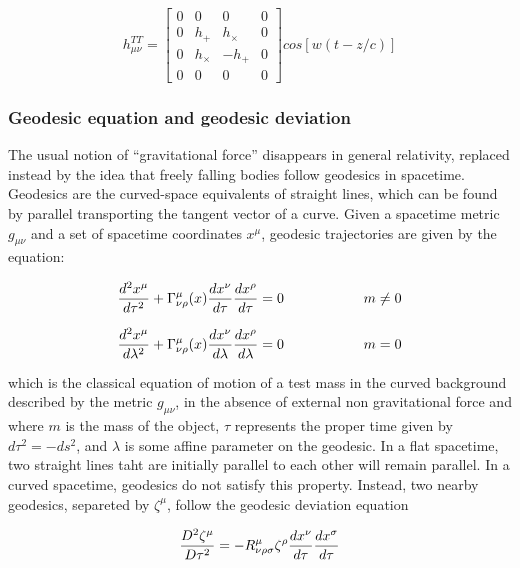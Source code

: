 \documentclass[binding=0.6cm, LaM]{sapthesis}
\begin{document}
		\begin{equation} 
		h_{\mu\nu}^{TT} = 
		\begin{bmatrix}
		0 & 0 & 0 & 0 \\
		0 & h_{+} & h_{\times} & 0 \\
		0 & h_{\times} & -h_{+} & 0 \\
		0 & 0 & 0 & 0 
		\end{bmatrix}cos[w(t-z/c)]
		\end{equation}

\subsubsection{Geodesic equation and geodesic deviation}

	The usual notion of “gravitational force” disappears in general relativity, replaced instead 
	by the idea that freely falling bodies follow geodesics in spacetime.
	Geodesics are the curved-space equivalents of straight lines, which can be found by 
	parallel transporting the tangent vector of a curve.
	Given a spacetime metric $g_{\mu\nu}$ and a set of spacetime coordinates $x^{\mu}$, 
	geodesic trajectories are given by the equation:

		\begin{equation}
		{{d^2x^{\mu}}\over{d\tau^2}} + \Gamma_{\nu\rho}^{\mu}(x){{dx^{\nu}}\over{d\tau}}{{dx^{\rho}}\over{d\tau}} = 0 \hspace*{2cm} m \neq 0
		\end{equation}

		\begin{equation}
		{{d^2x^{\mu}}\over{d\lambda^2}} + \Gamma_{\nu\rho}^{\mu}(x){{dx^{\nu}}\over{d\lambda}}{{dx^{\rho}}\over{d\lambda}} = 0 \hspace*{2cm} m = 0
		\end{equation}

	which is the classical equation of motion of a test mass in the curved background described 
	by the metric $g_{\mu\nu}$, in the absence of external non gravitational force and where $m$ is the mass
	of the object, $\tau$ represents the proper time given by $d\tau^2 = -ds^2$, 
	and $\lambda$ is some affine parameter on the geodesic.
	In a flat spacetime, two straight lines taht are initially parallel to each other will remain parallel. 
	In a curved spacetime, geodesics do not satisfy this property.
	Instead, two nearby geodesics, separeted by $\zeta^{\mu}$, follow the geodesic deviation equation
		
		\begin{equation}
		{{D^2\zeta^{\mu}}\over{D\tau^2}} = -R^{\mu}_{\nu\rho\sigma}\zeta^{\rho}{{dx^{\nu}}\over{d\tau}}{{dx^{\sigma}}\over{d\tau}}
		\end{equation}
\end{document}
